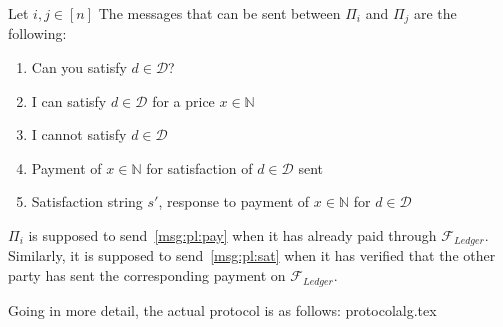   Let $i, j \in \left[n\right]$ The messages that can be sent between $\Pi_i$ and $\Pi_j$
  are the following:
  \begin{enumerate}
    \item Can you satisfy $d \in \mathcal{D}$?
    \item I can satisfy $d \in \mathcal{D}$ for a price $x \in \mathbb{N}$
    \item I cannot satisfy $d \in \mathcal{D}$
    \item \label{msg:pl:pay} Payment of $x \in \mathbb{N}$ for satisfaction of $d \in \mathcal{D}$ sent
    \item \label{msg:pl:sat} Satisfaction string $s'$, response to payment of $x \in \mathbb{N}$ for $d \in
    \mathcal{D}$
  \end{enumerate}
  $\Pi_i$ is supposed to send~\ref{msg:pl:pay} when it has already paid through
  $\mathcal{F}_{Ledger}$. Similarly, it is supposed to send~\ref{msg:pl:sat} when it has
  verified that the other party has sent the corresponding payment on
  $\mathcal{F}_{Ledger}$.

  Going in more detail, the actual protocol is as follows:
  {protocolalg.tex}
